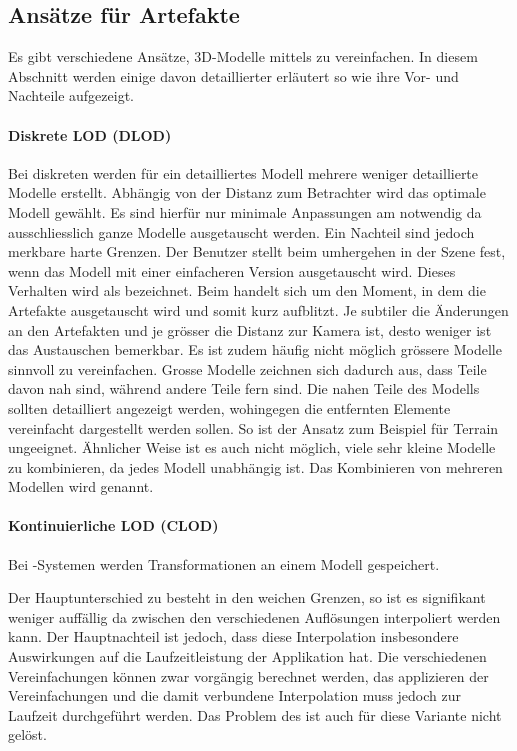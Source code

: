 \subsection{Ansätze für  Artefakte}
\label{chap:differentLodApproaches}
Es gibt verschiedene Ansätze, 3D-Modelle mittels  zu vereinfachen. In diesem Abschnitt werden einige davon detaillierter erläutert so wie ihre Vor- und Nachteile aufgezeigt.

\paragraph{Diskrete LOD (DLOD)}
Bei diskreten  werden für ein detailliertes Modell mehrere weniger detaillierte Modelle erstellt.
Abhängig von der Distanz zum Betrachter wird das optimale Modell gewählt. Es sind hierfür nur minimale Anpassungen am  notwendig da ausschliesslich ganze Modelle ausgetauscht werden.
Ein Nachteil sind jedoch merkbare harte Grenzen. Der Benutzer stellt beim umhergehen in der Szene fest, wenn das Modell mit einer einfacheren Version ausgetauscht wird.
Dieses Verhalten wird als  bezeichnet. Beim  handelt sich um den Moment, in dem die Artefakte ausgetauscht wird und somit kurz aufblitzt. Je subtiler die Änderungen an den Artefakten und je grösser die Distanz zur Kamera ist, desto weniger ist das Austauschen bemerkbar.
Es ist zudem häufig nicht möglich grössere Modelle sinnvoll zu vereinfachen. Grosse Modelle zeichnen sich dadurch aus, dass Teile davon nah sind, während andere Teile fern sind. Die nahen Teile des Modells sollten detailliert angezeigt werden, wohingegen die entfernten Elemente vereinfacht dargestellt werden sollen. So ist der Ansatz zum Beispiel für Terrain ungeeignet. Ähnlicher Weise ist es auch nicht möglich, viele sehr kleine Modelle zu kombinieren, da jedes Modell unabhängig ist. Das Kombinieren von mehreren Modellen wird  genannt.

\paragraph{Kontinuierliche LOD (CLOD)}
Bei -Systemen werden Transformationen an einem Modell gespeichert.

Der Hauptunterschied zu  besteht in den weichen Grenzen, so ist es signifikant weniger auffällig da zwischen den verschiedenen Auflösungen interpoliert werden kann.
Der Hauptnachteil ist jedoch, dass diese Interpolation insbesondere Auswirkungen auf die Laufzeitleistung der Applikation hat. Die verschiedenen Vereinfachungen können zwar vorgängig berechnet werden, das applizieren der Vereinfachungen und die damit verbundene Interpolation muss jedoch zur Laufzeit durchgeführt werden.
Das Problem des  ist auch für diese Variante nicht gelöst.

